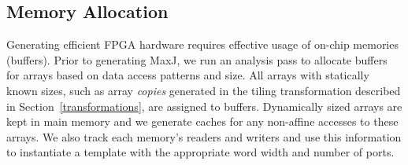 \subsection{Memory Allocation}
Generating efficient FPGA hardware requires effective usage of on-chip memories (buffers).
Prior to generating MaxJ, we run an analysis pass to allocate buffers for arrays based on data access patterns and size.
All arrays with statically known sizes, such as array \emph{copies} generated in the tiling transformation described in
Section~\ref{transformations}, are assigned to buffers. Dynamically sized arrays are kept in main memory and we generate
caches for any non-affine accesses to these arrays.
We also track each memory's readers and writers and use this information
to instantiate a template with the appropriate word width and number of ports.


